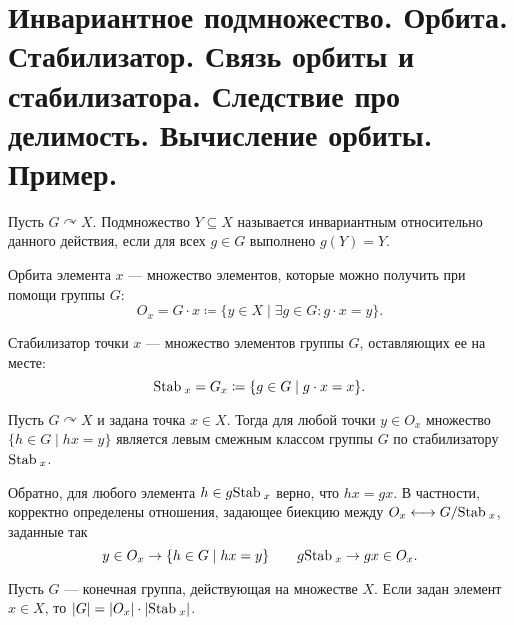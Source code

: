 % 
% 
\section{Инвариантное подмножество. Орбита. Стабилизатор. Связь орбиты и стабилизатора. Следствие про делимость. Вычисление орбиты. Пример.}
\begin{defn}
    Пусть $ G \curvearrowright X$. Подмножество  $ Y \subseteq X$ называется {\sf инвариантным} относительно данного действия, если для всех $ g \in G$ выполнено $ g(Y) = Y$.
\end{defn}
\begin{defn}[Орбита]
    {\sf Орбита } элемента $ x$ --- множество элементов, которые можно получить при помощи группы  $ G$:
    \[
    O_x = G \cdot x \coloneqq \{ y \in X \mid \exists g \in G\colon g\cdot x = y\}
    .\] 
\end{defn}
\begin{defn}[Стабилизатор]
    {\sf Стабилизатор} точки $ x$ --- множество элементов группы  $ G$, оставляющих ее на месте:
    \[
    {\mathop{\text{\rm Stab}}}\:_x = G_x \coloneqq \{g \in G \mid g\cdot x = x\}
    .\] 
\end{defn}
\begin{thm}
    Пусть $ G \curvearrowright X$  и задана точка $ x \in X$. Тогда для любой точки $ y \in O_x$ множество $ \{h \in G \mid hx = y\}$ является левым смежным классом группы $ G$ по стабилизатору  $ {\mathop{\text{\rm Stab}}}\:_x$. 

    Обратно, для любого элемента $ h \in g{\mathop{\text{\rm Stab}}}\:_x$ верно, что $ hx = gx$. В частности, корректно определены отношения, задающее биекцию между  $ O_x \longleftrightarrow G / {\mathop{\text{\rm Stab}}}\:_x$,  заданные так
     \[
    y \in O_x \to \{h \in G \mid hx = y\}\qquad g{\mathop{\text{\rm Stab}}}\:_x \to  gx \in O_x
    .\] 
\end{thm}
\begin{cor}
    Пусть $ G$ --- конечная группа, действующая на множестве $ X$. Если задан элемент $ x \in X$, то
    $ \lvert G \rvert  = \lvert O_x \rvert \cdot \lvert {\mathop{\text{\rm Stab}}}\:_x \rvert $.
\end{cor}
% 
